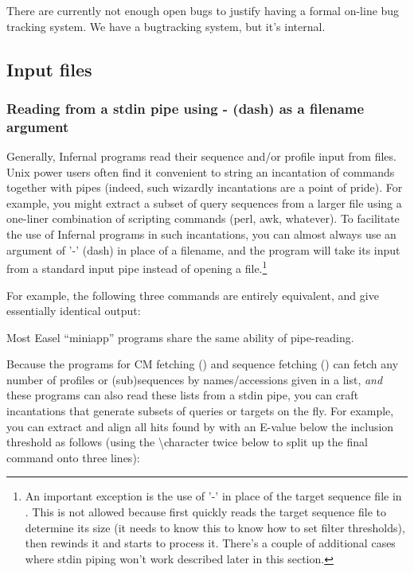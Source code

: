 There are currently not enough open bugs to justify having a formal
on-line bug tracking system. We have a bugtracking system, but it's
internal.

\subsection{Input files}

\subsubsection{Reading from a stdin pipe using - (dash) as a filename argument}

Generally, Infernal programs read their sequence and/or profile input
from files. Unix power users often find it convenient to string an
incantation of commands together with pipes (indeed, such wizardly
incantations are a point of pride). For example, you might extract a
subset of query sequences from a larger file using a one-liner
combination of scripting commands (perl, awk, whatever). To facilitate
the use of Infernal programs in such incantations, you can almost
always use an argument of '-' (dash) in place of a filename, and the
program will take its input from a standard input pipe instead of
opening a file.\footnote{An important exception is the use of '-' in
place of the target sequence file in . This is not
allowed because  first quickly reads the target
sequence file to determine its size (it needs to know this to know how
to set filter thresholds), then rewinds it and starts to process
it. There's a couple of additional cases where stdin piping won't work
described later in this section.}

For example, the following three commands are entirely equivalent, and
give essentially identical output:




Most Easel ``miniapp'' programs share the same ability of pipe-reading.

Because the programs for CM fetching () and
sequence fetching () can fetch any number of profiles
or (sub)sequences by names/accessions given in a list, \emph{and} these
programs can also read these lists from a stdin pipe, you can craft
incantations that generate subsets of queries or targets on the
fly. For example, you can extract and align all hits found by
 with an E-value below the inclusion threshold as 
follows (using the \textbackslash character twice below to split up the final
command onto three lines):

